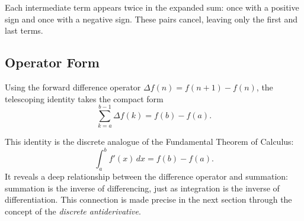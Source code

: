 \begin{remark*}[Intuition]
Each intermediate term appears twice in the expanded sum: once with a
positive sign and once with a negative sign. These pairs cancel, leaving
only the first and last terms.
\end{remark*}

\subsection*{Operator Form}

Using the forward difference operator \(\Delta f(n) = f(n+1) - f(n)\),
the telescoping identity takes the compact form
\[
\sum_{k=a}^{b-1} \Delta f(k) = f(b) - f(a).
\]

\begin{remark*}
This identity is the discrete analogue of the Fundamental Theorem of
Calculus:
\[
\int_a^b f'(x)\,dx = f(b)-f(a).
\]
It reveals a deep relationship between the difference operator and
summation: summation is the inverse of differencing, just as integration
is the inverse of differentiation. This connection is made precise in the
next section through the concept of the \emph{discrete antiderivative}.
\end{remark*}
